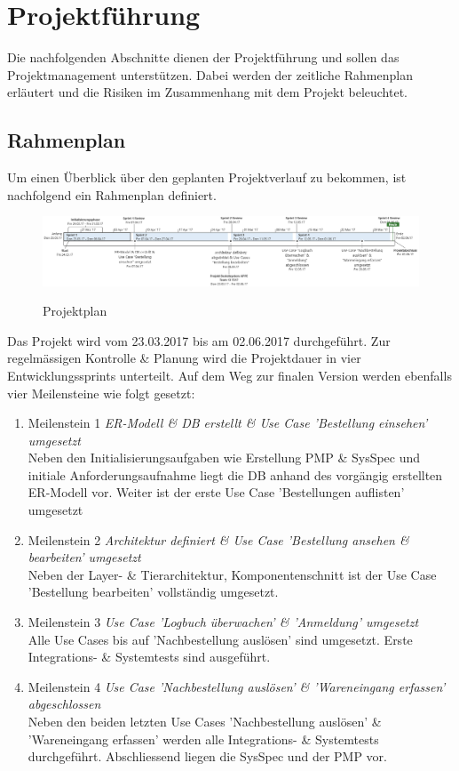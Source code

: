 \section{Projektführung}
Die nachfolgenden Abschnitte dienen der Projektführung und sollen das Projektmanagement unterstützen. Dabei werden der zeitliche Rahmenplan erläutert und die Risiken im Zusammenhang mit dem Projekt beleuchtet.
\subsection{Rahmenplan}
Um einen Überblick über den geplanten Projektverlauf zu bekommen, ist nachfolgend
ein Rahmenplan definiert.
\begin{figure}[H]%
\centering
\includegraphics[width=1.0\textwidth]{Images/GroberTerminplan.png}
\label{fig:projectplan}
\caption{Projektplan}
\end{figure}
Das Projekt wird vom 23.03.2017 bis am 02.06.2017 durchgeführt. Zur regelmässigen Kontrolle \& Planung wird die Projektdauer in vier Entwicklungssprints unterteilt. Auf dem Weg zur finalen Version werden ebenfalls vier Meilensteine wie folgt gesetzt:
\begin{enumerate}
\item Meilenstein 1 \textit{ER-Modell \& DB erstellt \& Use Case 'Bestellung einsehen' umgesetzt}\\
Neben den Initialisierungsaufgaben wie Erstellung PMP \& SysSpec und initiale Anforderungsaufnahme liegt die DB anhand des vorgängig erstellten ER-Modell vor. Weiter ist der erste Use Case 'Bestellungen auflisten' umgesetzt
\item Meilenstein 2 \textit{Architektur definiert \& Use Case 'Bestellung ansehen \& bearbeiten' umgesetzt}\\
Neben der Layer- \& Tierarchitektur, Komponentenschnitt ist der Use Case 'Bestellung bearbeiten' vollständig umgesetzt. 
\item Meilenstein 3 \textit{Use Case 'Logbuch überwachen' \& 'Anmeldung' umgesetzt} \\
Alle Use Cases bis auf 'Nachbestellung auslösen' sind umgesetzt. Erste Integrations- \& Systemtests sind ausgeführt.
\item Meilenstein 4 \textit{Use Case 'Nachbestellung auslösen' \& 'Wareneingang erfassen' abgeschlossen}\\
Neben den beiden letzten Use Cases 'Nachbestellung auslösen' \& 'Wareneingang erfassen' werden alle Integrations- \& Systemtests durchgeführt. Abschliessend liegen die SysSpec und der PMP vor.
\end{enumerate}
\clearpage
